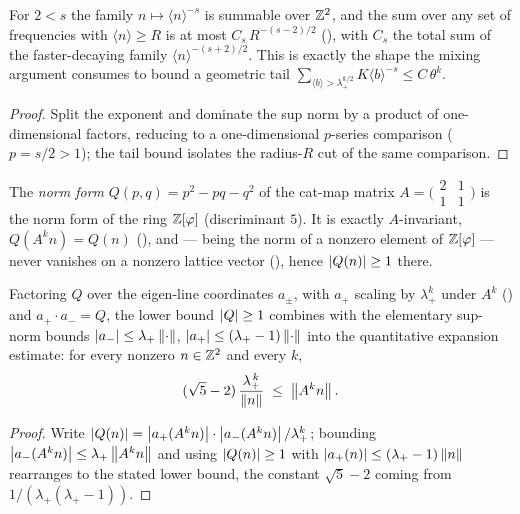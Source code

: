 \begin{lemma}\label{summable_bracket_rpow}
  \leanok
  For \(2 < s\) the family \(n\mapsto\langle n\rangle^{-s}\) is summable over \(\mathbb{Z}^2\), and the sum
  over any set of frequencies with \(\langle n\rangle\ge R\) is at most \(C_s\,R^{-(s-2)/2}\)
  (), with \(C_s\) the total sum of the
  faster-decaying family \(\langle n\rangle^{-(s+2)/2}\). This is exactly the shape the mixing
  argument consumes to bound a geometric tail \(\sum_{\langle b\rangle>\lambda_+^{k/2}} K\langle
  b\rangle^{-s} \le C\,\theta^{k}\).
\end{lemma}
\begin{proof}\leanok
  Split the exponent and dominate the sup norm by a product of one-dimensional factors, reducing to a
  one-dimensional \(p\)-series comparison (\(p = s/2 > 1\)); the tail bound isolates the radius-\(R\)
  cut of the same comparison.
\end{proof}

\begin{definition}\label{Qform}
  \leanok
  The \emph{norm form} \(Q(p,q) = p^2 - p q - q^2\) of the cat-map matrix \(A = \bigl(\begin{smallmatrix}2&1\\1&1\end{smallmatrix}\bigr)\)
  is the norm form of the ring \(\mathbb{Z}[\varphi]\) (discriminant \(5\)). It is exactly \(A\)-invariant,
  \(Q(A^k n) = Q(n)\) (), and --- being the norm of
  a nonzero element of \(\mathbb{Z}[\varphi]\) --- never vanishes on a nonzero lattice vector
  (), hence \(\left\lvert Q(n) \right\rvert\ge 1\) there.
\end{definition}

\begin{theorem}\label{lemma_beta}
  \leanok
  Factoring \(Q\) over the eigen-line coordinates \(a_{\pm}\), with \(a_+\) scaling by
  \(\lambda_+^k\) under \(A^k\) () and
  \(a_+\cdot a_- = Q\), the lower bound \(\left\lvert Q \right\rvert\ge 1\) combines with the elementary sup-norm bounds
  \(\left\lvert a_- \right\rvert\le\lambda_+\left\lVert \cdot \right\rVert\), \(\left\lvert a_+ \right\rvert\le(\lambda_+-1)\left\lVert \cdot \right\rVert\) into the
  quantitative expansion estimate: for every nonzero \(n\in\mathbb{Z}^2\) and every \(k\),
  \[
    (\sqrt5 - 2)\,\frac{\lambda_+^{\,k}}{\left\lVert n \right\rVert} \;\le\; \left\lVert A^k n \right\rVert.
  \]
\end{theorem}
\begin{proof}\leanok
  Write \(\left\lvert Q(n) \right\rvert = \left\lvert a_+(A^k n) \right\rvert\cdot\left\lvert a_-(A^k n) \right\rvert/\lambda_+^{k}\); bounding
  \(\left\lvert a_-(A^k n) \right\rvert\le\lambda_+\left\lVert A^k n \right\rVert\) and using \(\left\lvert Q(n) \right\rvert\ge 1\) with
  \(\left\lvert a_+(n) \right\rvert\le(\lambda_+-1)\left\lVert n \right\rVert\) rearranges to the stated lower bound, the constant
  \(\sqrt5 - 2\) coming from \(1/(\lambda_+(\lambda_+-1))\).
\end{proof}

